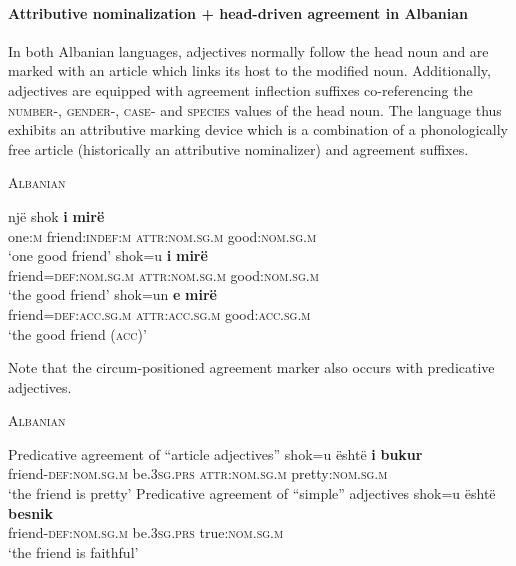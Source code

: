 \paragraph{Attributive nominalization + head-driven agreement in Albanian}
In both Albanian languages, adjectives normally follow the head noun and are marked with an article which links its host to the modified noun. Additionally, adjectives are equipped with agreement inflection suffixes co-referencing the \textsc{number}-, \textsc{gender}-, \textsc{case}- and \textsc{species} values of the head noun. The language thus exhibits an attributive marking device which is a combination of a phonologically free article (historically an attributive nominalizer) and agreement suffixes.
\begin{exe}
\ex \textsc{Albanian} \citep[166–167]{himmelmann1997} \label{albanian ex}
\begin{xlist}
\ex
\gll	nj\"e	shok 	\textbf{i}	\textbf{mir\"e}\\
	one:\textsc{m}	friend:\textsc{indef:m} 	\textsc{attr:nom.sg.m}	good:\textsc{nom.sg.m}\\
\glt	‘one good friend’
\ex	
\gll	shok=u			\textbf{i}			\textbf{mir\"e}\\
	friend=\textsc{def:nom.sg.m} 	\textsc{attr:nom.sg.m} 	good:\textsc{nom.sg.m}\\
\glt	‘the good friend’
\ex
\gll	shok=un					\textbf{e}			\textbf{mir\"e}\\
	friend=\textsc{def:acc.sg.m} 	\textsc{attr:acc.sg.m} 	good:\textsc{acc.sg.m}\\
\glt	‘the good friend (\textsc{acc})’
\end{xlist}
\end{exe}
Note that the circum-positioned agreement marker also occurs with predicative adjectives. 
\begin{exe}
\ex \textsc{Albanian} \citep{demiraj1998}
\begin{xlist}
\ex Predicative agreement of “article adjectives”
\gll	shok=u \"esht\"e \textbf{i} \textbf{bukur}\\
	friend-\textsc{def:nom.sg.m} be\textsc{.3sg.prs} \textsc{attr:nom.sg.m} pretty:\textsc{nom.sg.m}\\
\glt	‘the friend is pretty’
\ex Predicative agreement of “simple” adjectives
\gll	shok=u \"esht\"e \textbf{besnik}\\
	friend-\textsc{def:nom.sg.m} be\textsc{.3sg.prs} true:\textsc{nom.sg.m}\\
\glt	‘the friend is faithful’
\end{xlist}
\end{exe}
